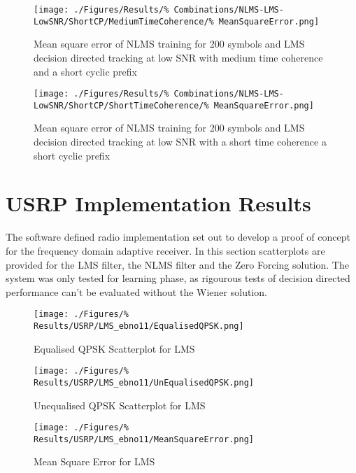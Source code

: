 \begin{figure}[ht]
	\centering
	\begin{minipage}{0.49\textwidth}
		\centering
		\texttt{[image: ./Figures/Results/\%
	Combinations/NLMS-LMS-LowSNR/ShortCP/MediumTimeCoherence/\%
	MeanSquareError.png]}
		\captionsetup{width=0.75\linewidth}
		\caption{Mean square error of NLMS training for 200 symbols 
	and LMS decision directed tracking at low SNR with medium time coherence 
	and a short cyclic prefix}
	\end{minipage}
	\begin{minipage}{0.49\textwidth}
		\centering
		\texttt{[image: ./Figures/Results/\%
	Combinations/NLMS-LMS-LowSNR/ShortCP/ShortTimeCoherence/\%
	MeanSquareError.png]}
		\captionsetup{width=0.75\linewidth}
		\caption{Mean square error of NLMS training for 200 symbols 
	and LMS decision directed tracking at low SNR with a short time coherence 
	a short cyclic prefix}
		\label{fig:Combination-Short-Short}
	\end{minipage}
\end{figure}


\section{USRP Implementation Results}
\label{sec:USRPResults}
\FloatBarrier
The software defined radio implementation set out to develop %
a proof of concept for the frequency domain adaptive receiver. In %
this section scatterplots are provided for the LMS filter, the NLMS %
filter and the Zero Forcing solution. The system was only tested %
for learning phase, as rigourous tests of decision directed %
performance can't be evaluated without the Wiener solution.

\begin{figure}[ht]
	\centering
	\begin{minipage}{0.49\textwidth}
		\centering
		\texttt{[image: ./Figures/\%
		Results/USRP/LMS\_ebno11/EqualisedQPSK.png]}
		\captionsetup{width=0.75\linewidth}
		\caption{Equalised QPSK Scatterplot for LMS}
	\end{minipage}
	\begin{minipage}{0.49\textwidth}
		\centering
		\texttt{[image: ./Figures/\%
		Results/USRP/LMS\_ebno11/UnEqualisedQPSK.png]}
		\captionsetup{width=0.75\linewidth}
		\caption{Unequalised QPSK Scatterplot for LMS}
	\end{minipage}
\end{figure}
\begin{figure}[ht]
	\centering
	\texttt{[image: ./Figures/\%
	Results/USRP/LMS\_ebno11/MeanSquareError.png]}
	\captionsetup{width=0.75\linewidth}
	\caption{Mean Square Error for LMS}
\end{figure}

